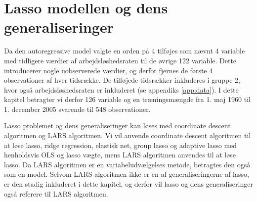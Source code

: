 \chapter{Lasso modellen og dens generaliseringer} \label{ch:shrinkage_metoder}
Da den autoregressive model valgte en orden på 4 tilføjes som nævnt 4 variable med tidligere værdier af arbejdsløshedsraten til de øvrige 122 variable. 
Dette introducerer nogle uobserverede værdier, og derfor fjernes de første 4 observationer af hver tidsrække.
De tilføjede tidsrækker inkluderes i gruppe 2, hvor også arbejdsløshedsraten er inkluderet (se appendiks \ref{app:data}).
I dette kapitel betragter vi derfor 126 variable og en træningsmængde fra 1. maj 1960 til 1. december 2005 svarende til 548 observationer. 

Lasso problemet og dens generaliseringer kan løses med coordinate descent algoritmen og LARS algoritmen.
Vi vil anvende coordinate descent algoritmen til at løse lasso, ridge regression, elastisk net, group lasso og adaptive lasso med henholdsvis OLS og lasso vægte, mens LARS algoritmen anvendes til at løse lasso. 
Da LARS algoritmen er en variabeludvælgelses metode, betragtes den også som en model.
Selvom LARS algoritmen ikke er en af generaliseringerne af lasso, er den stadig inkluderet i dette kapitel, og derfor vil lasso og dens generaliseringer også referere til LARS algoritmen.  



